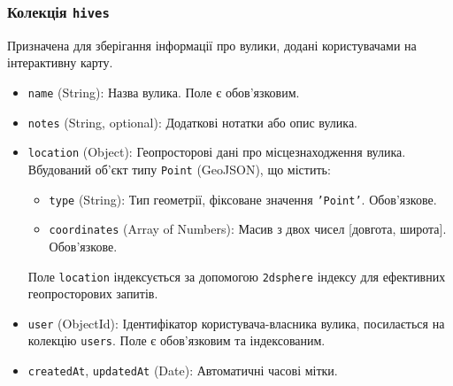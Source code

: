 \subsubsection*{Колекція \texttt{hives}}
Призначена для зберігання інформації про вулики, додані користувачами на інтерактивну карту.
\begin{itemize}
    \item \texttt{name} (String): Назва вулика. Поле є обов'язковим.
    \item \texttt{notes} (String, optional): Додаткові нотатки або опис вулика.
    \item \texttt{location} (Object): Геопросторові дані про місцезнаходження вулика. Вбудований об'єкт типу \texttt{Point} (GeoJSON), що містить:
    \begin{itemize}
        \item \texttt{type} (String): Тип геометрії, фіксоване значення \texttt{'Point'}. Обов'язкове.
        \item \texttt{coordinates} (Array of Numbers): Масив з двох чисел [довгота, широта]. Обов'язкове.
    \end{itemize}
    Поле \texttt{location} індексується за допомогою \texttt{2dsphere} індексу для ефективних геопросторових запитів.
    \item \texttt{user} (ObjectId): Ідентифікатор користувача-власника вулика, посилається на колекцію \texttt{users}. Поле є обов'язковим та індексованим.
    \item \texttt{createdAt}, \texttt{updatedAt} (Date): Автоматичні часові мітки.
\end{itemize}

